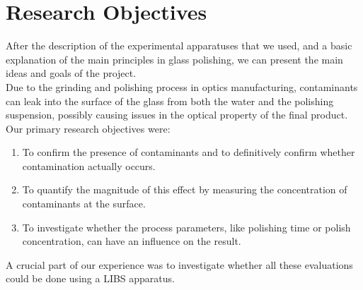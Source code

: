 \label{ch:research_premises}
\section{Research Objectives}
After the description of the experimental apparatuses that we used, and a basic explanation of the main principles in glass polishing, we can present the main ideas and goals of the project.
\\
Due to the grinding and polishing process in optics manufacturing, contaminants can leak into the surface of the glass from both the water and the polishing suspension, possibly causing issues in the optical property of the final product.
\\
Our primary research objectives were:
\begin{enumerate}
    \item To confirm the presence of contaminants and to definitively confirm whether contamination actually occurs.
    \item To quantify the magnitude of this effect by measuring the concentration of contaminants at the surface.
    \item To investigate whether the process parameters, like polishing time or polish concentration, can have an influence on the result.
\end{enumerate}
A crucial part of our experience was to investigate whether all these evaluations could be done using a LIBS apparatus.

